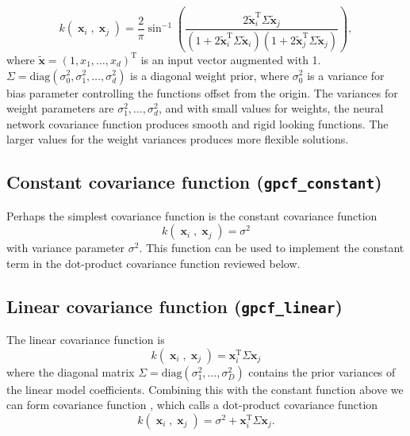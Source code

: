 \documentclass[twoside,11pt]{article}
\DeclareMathOperator{\x}{\mathbf{x}}
\newcommand{\code}[1]{{\normalfont\texttt{#1}}}
\begin{document}
\begin{equation}\label{cf_neuralnetwork}
k(\x_i,\x_j)=\frac{2}{\pi}\sin^{-1}\left(\frac{2\mathbf{\tilde{x}}_i^{\text{T}}\Sigma \mathbf{\tilde{x}}_j}{(1+2\mathbf{\tilde{x}}_i^{\text{T}}\Sigma
      \mathbf{\tilde{x}}_i)(1+2\mathbf{\tilde{x}}_j^{\text{T}}\Sigma
      \mathbf{\tilde{x}}_j)}\right),
\end{equation}
where $\mathbf{\tilde{x}}=(1,x_1,\ldots,x_d)^{\text{T}}$ is an input
vector augmented with 1.
$\Sigma=\text{diag}(\sigma_0^2,\sigma_1^2,\ldots,\sigma_d^2)$ is a
diagonal weight prior, where $\sigma_0^2$ is a variance for bias
parameter controlling the functions offset from the origin. The
variances for weight parameters are
$\sigma_1^2,\ldots,\sigma_d^2$, and with small values for weights, the
neural network covariance function produces smooth and rigid looking
functions. The larger values for the weight variances produces more
flexible solutions.

\subsection*{Constant covariance function (\code{gpcf\_constant})}

Perhaps the simplest covariance function is the constant covariance
function
\begin{equation}\label{cf_constant}
  k(\x_i,\x_j) = \sigma^2
\end{equation}
with variance parameter $\sigma^2$. This function can be used to
implement the constant term in the dot-product covariance function
\citep{Rasmussen+Williams:2006} reviewed below.

\subsection*{Linear  covariance function  (\code{gpcf\_linear})}

The linear covariance function is
\begin{equation}\label{cf_linear}
  k(\x_i,\x_j)=\mathbf{x}_i^{\text{T}}\Sigma \mathbf{x}_j
\end{equation}
where the diagonal matrix
$\Sigma=\text{diag}(\sigma_1^2,\ldots,\sigma_D^2)$ contains the
prior variances of the linear model coefficients. Combining this
with the constant function above we can form covariance function
\citet{Rasmussen+Williams:2006}, which calls a dot-product
covariance function
\begin{equation}\label{cf_linear2}
  k(\x_i,\x_j)= \sigma^2 + \mathbf{x}_i^{\text{T}}\Sigma \mathbf{x}_j.
\end{equation}
\end{document}
